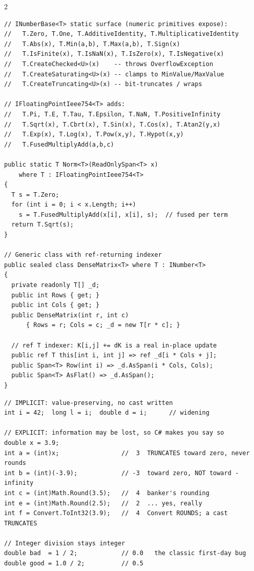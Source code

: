 \documentclass[9pt,a4paper]{extarticle}
\newenvironment{card}[3][acBlue]{%
  \begin{tcolorbox}[
    enhanced, colback=#2, colframe=bdCard,
    coltitle=black, colbacktitle=#2!70!bgHdr,
    fonttitle=\bfseries\fontsize{6.16pt}{7.48pt}\selectfont\MakeUppercase,
    title={#3},
    left=3pt, right=2pt, top=1.4pt, bottom=1.8pt,
    toptitle=1pt, bottomtitle=1pt,
    boxrule=0.4pt,
    borderline west={3pt}{0pt}{#1},
    arc=2pt, before skip=0pt, after skip=1.6mm,
    breakable, toprule at break=0pt, bottomrule at break=0pt,
  ]}{\end{tcolorbox}}
\begin{document}
\begin{multicols}{2}
\begin{card}[acPurple]{bgPurple}{Generics, INumber\ensuremath{\langle}T\ensuremath{\rangle}\ \& Constraints}
\begin{lstlisting}[style=cs]
// INumberBase<T> static surface (numeric primitives expose):
//   T.Zero, T.One, T.AdditiveIdentity, T.MultiplicativeIdentity
//   T.Abs(x), T.Min(a,b), T.Max(a,b), T.Sign(x)
//   T.IsFinite(x), T.IsNaN(x), T.IsZero(x), T.IsNegative(x)
//   T.CreateChecked<U>(x)    -- throws OverflowException
//   T.CreateSaturating<U>(x) -- clamps to MinValue/MaxValue
//   T.CreateTruncating<U>(x) -- bit-truncates / wraps

// IFloatingPointIeee754<T> adds:
//   T.Pi, T.E, T.Tau, T.Epsilon, T.NaN, T.PositiveInfinity
//   T.Sqrt(x), T.Cbrt(x), T.Sin(x), T.Cos(x), T.Atan2(y,x)
//   T.Exp(x), T.Log(x), T.Pow(x,y), T.Hypot(x,y)
//   T.FusedMultiplyAdd(a,b,c)

public static T Norm<T>(ReadOnlySpan<T> x)
    where T : IFloatingPointIeee754<T>
{
  T s = T.Zero;
  for (int i = 0; i < x.Length; i++)
    s = T.FusedMultiplyAdd(x[i], x[i], s);  // fused per term
  return T.Sqrt(s);
}

// Generic class with ref-returning indexer
public sealed class DenseMatrix<T> where T : INumber<T>
{
  private readonly T[] _d;
  public int Rows { get; }
  public int Cols { get; }
  public DenseMatrix(int r, int c)
      { Rows = r; Cols = c; _d = new T[r * c]; }

  // ref T indexer: K[i,j] += dK is a real in-place update
  public ref T this[int i, int j] => ref _d[i * Cols + j];
  public Span<T> Row(int i) => _d.AsSpan(i * Cols, Cols);
  public Span<T> AsFlat() => _d.AsSpan();
}
\end{lstlisting}
\end{card}

\begin{card}[acAmber]{bgAmber}{Conversions, Casting \& Boxing}
\begin{lstlisting}[style=cs]
// IMPLICIT: value-preserving, no cast written
int i = 42;  long l = i;  double d = i;      // widening

// EXPLICIT: information may be lost, so C# makes you say so
double x = 3.9;
int a = (int)x;                 //  3  TRUNCATES toward zero, never rounds
int b = (int)(-3.9);            // -3  toward zero, NOT toward -infinity
int c = (int)Math.Round(3.5);   //  4  banker's rounding
int e = (int)Math.Round(2.5);   //  2  ... yes, really
int f = Convert.ToInt32(3.9);   //  4  Convert ROUNDS; a cast TRUNCATES

// Integer division stays integer
double bad  = 1 / 2;            // 0.0   the classic first-day bug
double good = 1.0 / 2;          // 0.5


\end{lstlisting}
\end{card}
\end{multicols}
\end{document}
